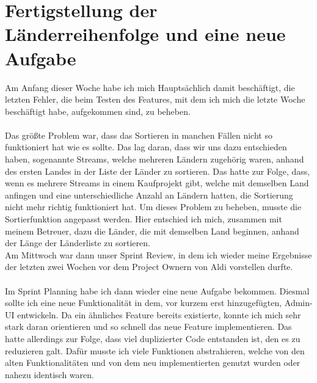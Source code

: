 \section{Fertigstellung der Länderreihenfolge und eine neue Aufgabe}
Am Anfang dieser Woche habe ich mich Hauptsächlich damit beschäftigt, die letzten Fehler, die beim Testen des Features, mit dem ich mich die letzte Woche beschäftigt habe, aufgekommen sind, zu beheben. \\\\
Das größte Problem war, dass das Sortieren in manchen Fällen nicht so funktioniert hat wie es sollte. Das lag daran, dass wir uns dazu entschieden haben, sogenannte Streams, welche mehreren Ländern zugehörig waren, anhand des ersten Landes in der Liste der Länder zu sortieren. Das hatte zur Folge, dass, wenn es mehrere Streams in einem Kaufprojekt gibt, welche mit demselben Land anfingen und eine unterschiedliche Anzahl an Ländern hatten, die Sortierung nicht mehr richtig funktioniert hat. Um dieses Problem zu beheben, musste die Sortierfunktion angepasst werden. Hier entschied ich mich, zusammen mit meinem Betreuer, dazu die Länder, die mit demselben Land beginnen, anhand der Länge der Länderliste zu sortieren. \\
Am Mittwoch war dann unser Sprint Review, in dem ich wieder meine Ergebnisse der letzten zwei Wochen vor dem Project Ownern von Aldi vorstellen durfte. \\\\
Im Sprint Planning habe ich dann wieder eine neue Aufgabe bekommen. Diesmal sollte ich eine neue Funktionalität in dem, vor kurzem erst hinzugefügten, Admin-UI entwickeln. Da ein ähnliches Feature bereits existierte, konnte ich mich sehr stark daran orientieren und so schnell das neue Feature implementieren. Das hatte allerdings zur Folge, dass viel duplizierter Code entstanden ist, den es zu reduzieren galt. Dafür musste ich viele Funktionen abstrahieren, welche von den alten Funktionalitäten und von dem neu implementierten genutzt wurden oder nahezu identisch waren. \\\\

